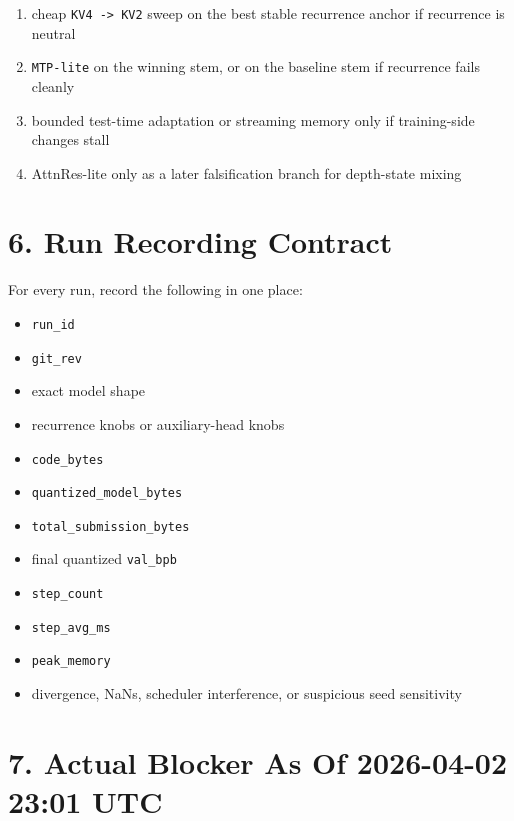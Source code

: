 \documentclass[11pt]{article}
\begin{document}
\begin{enumerate}
    \item cheap \texttt{KV4 -> KV2} sweep on the best stable recurrence anchor if recurrence is neutral
    \item \texttt{MTP-lite} on the winning stem, or on the baseline stem if recurrence fails cleanly
    \item bounded test-time adaptation or streaming memory only if training-side changes stall
    \item AttnRes-lite only as a later falsification branch for depth-state mixing
\end{enumerate}

\section*{6. Run Recording Contract}

For every run, record the following in one place:

\begin{itemize}
    \item \texttt{run\_id}
    \item \texttt{git\_rev}
    \item exact model shape
    \item recurrence knobs or auxiliary-head knobs
    \item \texttt{code\_bytes}
    \item \texttt{quantized\_model\_bytes}
    \item \texttt{total\_submission\_bytes}
    \item final quantized \texttt{val\_bpb}
    \item \texttt{step\_count}
    \item \texttt{step\_avg\_ms}
    \item \texttt{peak\_memory}
    \item divergence, NaNs, scheduler interference, or suspicious seed sensitivity
\end{itemize}

\section*{7. Actual Blocker As Of 2026-04-02 23:01 UTC}
\end{document}
